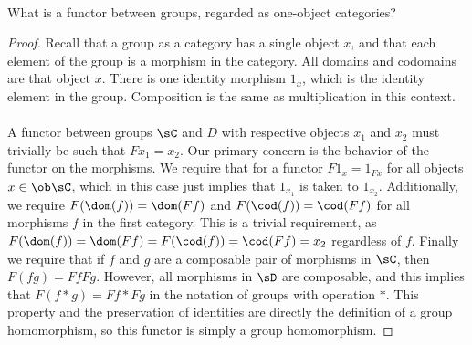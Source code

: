 \documentclass[../../main]{subfiles}
\begin{document}
\paragraph{}
\begin{exercise}
	What is a functor between groups, regarded as one-object categories?
\end{exercise}

\begin{proof}
	Recall that a group as a category has a single object \(x\), and that each
	element of the group is a morphism in the category.  All domains and
	codomains are that object \(x\).  There is one identity morphism \(1_x\),
	which is the identity element in the group.  Composition is the same as
	multiplication in this context. \\ \\ A functor between groups \(\sC\) and
	\(D\) with respective objects \(x_1\) and \(x_2\) must trivially be such
	that \(Fx_1 = x_2\).  Our primary concern is the behavior of the functor
	on the morphisms. We require that for a functor \(F1_x = 1_{Fx}\) for
	all objects \(x \in \ob\sC\), which in this case just implies that \(1_{x_1}\)
	is taken to \(1_{x_2}\).  Additionally, we require \(F(\dom(f)) =
	\dom(Ff)\) and \(F(\cod(f)) = \cod(Ff)\) for all morphisms \(f\) in the
	first category.  This is a trivial requirement, as \(F(\dom(f)) = \dom(Ff)
	= F(\cod(f))= \cod(Ff) = x_2\) regardless of \(f\).  Finally we require
	that if \(f\) and \(g\) are a composable pair of morphisms in \(\sC\), then
	\(F(fg) = FfFg\). However, all morphisms in \(\sD\) are composable, and
	this implies that \(F(f*g) = Ff*Fg\) in the notation of groups with
	operation \(*\).  This property and the preservation of identities are
	directly the definition of a group homomorphism, so this functor is simply a
	group homomorphism.
\end{proof}
\end{document}
